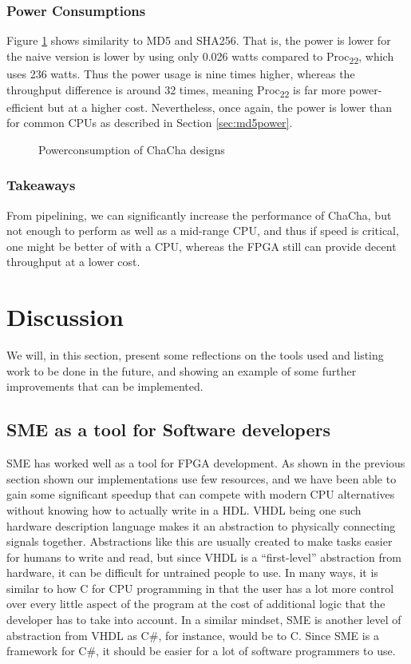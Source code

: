 \documentclass[a4paper, openany]{book}
\begin{document}
\subsection{Power Consumptions}
\label{sec:org6821fb1}
Figure \ref{fig:ChaCha_power} shows similarity to MD5 and SHA256. That is, the power is lower for the naive version is lower by using only 0.026 watts compared to Proc\textsubscript{22}, which uses 236 watts. Thus the power usage is nine times higher, whereas the throughput difference is around 32 times, meaning Proc\textsubscript{22} is far more power-efficient but at a higher cost. Nevertheless, once again, the power is lower than for common CPUs as described in Section \ref{sec:md5power}.

\begin{figure}[H]
\centering
{}
\caption[Power consumption of ChaCha20 designs]
{Powerconsumption of ChaCha designs}
\label{fig:ChaCha_power}
\end{figure}
\subsection{Takeaways}
\label{sec:org70bac1a}
From pipelining, we can significantly increase the performance of ChaCha, but not enough to perform as well as a mid-range CPU, and thus if speed is critical, one might be better of with a CPU, whereas the FPGA still can provide decent throughput at a lower cost.

\chapter{Discussion}
\label{sec:org1085886}
We will, in this section, present some reflections on the tools used and listing work to be done in the future, and showing an example of some further improvements that can be implemented.

\section{SME as a tool for Software developers}
\label{sec:org2a54e50}
SME has worked well as a tool for FPGA development. As shown in the previous section shown our implementations use few resources, and we have been able to gain some significant speedup that can compete with modern CPU alternatives without knowing how to actually write in a HDL. VHDL being one such hardware description language makes it an abstraction to physically connecting signals together.
Abstractions like this are usually created to make tasks easier for humans to write and read,
but since VHDL is a ``first-level'' abstraction from hardware, it can be difficult for untrained people to use. In many ways, it is similar to how C for CPU programming in that the user has a lot more control over every little aspect of the program at the cost of additional logic that the developer has to take into account.
In a similar mindset, SME is another level of abstraction from VHDL as C\#, for instance, would be to C. Since SME is a framework for C\#, it should be easier for a lot of software programmers to use.
\end{document}
